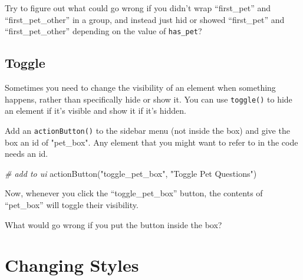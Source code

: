 \documentclass[
  oneside]{book}
\newenvironment{Shaded}{\begin{snugshade}}{\end{snugshade}}
\newcommand{\AttributeTok}[1]{\textcolor[rgb]{0.77,0.63,0.00}{#1}}
\newcommand{\CommentTok}[1]{\textcolor[rgb]{0.56,0.35,0.01}{\textit{#1}}}
\newcommand{\FunctionTok}[1]{\textcolor[rgb]{0.00,0.00,0.00}{#1}}
\newcommand{\NormalTok}[1]{#1}
\newcommand{\SpecialCharTok}[1]{\textcolor[rgb]{0.00,0.00,0.00}{#1}}
\newcommand{\StringTok}[1]{\textcolor[rgb]{0.31,0.60,0.02}{#1}}
\begin{document}
\begin{try}
Try to figure out what could go wrong if you didn't wrap ``first\_pet'' and ``first\_pet\_other'' in a group, and instead just hid or showed ``first\_pet'' and ``first\_pet\_other'' depending on the value of \texttt{has\_pet}?

\end{try}

\hypertarget{toggle}{%
\subsection{Toggle}\label{toggle}}

Sometimes you need to change the visibility of an element when something happens, rather than specifically hide or show it. You can use \texttt{toggle}\texttt{()} to hide an element if it's visible and show it if it's hidden.

Add an \texttt{actionButton}\texttt{()} to the sidebar menu (not inside the box) and give the box an \AttributeTok{id} of \StringTok{"pet\_box"}. Any element that you might want to refer to in the code needs an \AttributeTok{id}.

\begin{Shaded}
\begin{Highlighting}[]
\CommentTok{\# add to ui}
\FunctionTok{actionButton}\NormalTok{(}\StringTok{"toggle\_pet\_box"}\NormalTok{, }\StringTok{"Toggle Pet Questions"}\NormalTok{)}
\end{Highlighting}
\end{Shaded}

Now, whenever you click the ``toggle\_pet\_box'' button, the contents of ``pet\_box'' will toggle their visibility.

\begin{Shaded}
\end{Shaded}

\begin{try}
What would go wrong if you put the button inside the box?

\end{try}

\hypertarget{changing-styles}{%
\section{Changing Styles}\label{changing-styles}}
\end{document}
